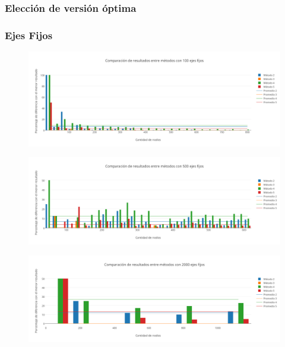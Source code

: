 \newpage 
 
\subsubsection{Elecci\'on de versi\'on \'optima}

\subsubsection*{Ejes Fijos}


  \begin{figure}[h!]
   \begin{center}
 	\includegraphics[scale=0.55]{imagenes/local/resultados/100ejes.png}
   \end{center}
 \end{figure}
 

  \begin{figure}[h!]
   \begin{center}
 	\includegraphics[scale=0.55]{imagenes/local/resultados/500ejes.png}
   \end{center}
 \end{figure}
 
   \begin{figure}[h!]
   \begin{center}
 	\includegraphics[scale=0.55]{imagenes/local/resultados/2000ejes.png}
   \end{center}
 \end{figure}
 
